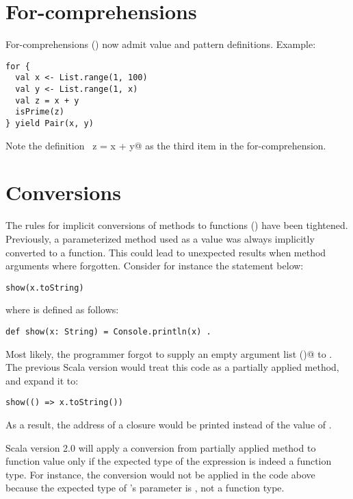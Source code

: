 \section{For-comprehensions}

For-comprehensions () now admit value and
pattern definitions. Example:
\begin{lstlisting}
for {
  val x <- List.range(1, 100)
  val y <- List.range(1, x)
  val z = x + y
  isPrime(z)
} yield Pair(x, y)
\end{lstlisting}
Note the definition ~\lstinline@val z = x + y@ as the third item in
the for-comprehension. 

\section{Conversions}

The rules for implicit conversions of methods to functions
() have been tightened. Previously, a
parameterized method used as a value was always implicitly converted
to a function. This could lead to unexpected results when method
arguments where forgotten. Consider for instance the statement below:
\begin{lstlisting}
show(x.toString)
\end{lstlisting}
where \lstinline@show@ is defined as follows:
\begin{lstlisting}
def show(x: String) = Console.println(x) .
\end{lstlisting}
Most likely, the programmer forgot to supply an empty argument list
\lstinline@()@ to \lstinline@toString@. The previous Scala version would
treat this code as a partially applied method, and expand it to:
\begin{lstlisting}
show(() => x.toString())
\end{lstlisting}
As a result, the address of a closure would be printed instead of the
value of \lstinline@s@.

Scala version 2.0 will apply a conversion from partially applied
method to function value only if the expected type of the expression
is indeed a function type. For instance, the conversion would not be
applied in the code above because the expected type of
\lstinline@show@'s parameter is \lstinline@String@, not a function
type. 

